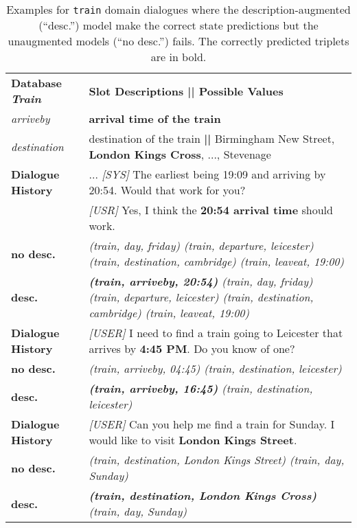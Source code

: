\documentclass[11pt]{article}
\begin{document}
\begin{table*}[t]
    \small
    \centering

    \vspace{-0.5\baselineskip}
    \begin{tabular}{lp{12.0cm}}
\toprule
        \textbf{Database \textit{Train}} & \textbf{Slot Descriptions || Possible Values}\\
        \textit{arriveby}   & \textbf{arrival time of the train} \\
\textit{destination}  & destination of the train \textbf{||} Birmingham New Street, \textbf{London Kings Cross}, ..., Stevenage\\


        \midrule
        \textbf{Dialogue History}  & ... \textit{[SYS]} The earliest being 19:09 and arriving by 20:54. Would that work for you?\\ & \textit{[USR]} Yes, I think the \textbf{20:54 arrival time} should work.\\
        \textbf{no desc.} & \textit{(train, day, friday) (train, departure, leicester) (train, destination, cambridge) (train, leaveat, 19:00)} \\
        \textbf{desc.} & \textit{\textbf{(train, arriveby, 20:54)} (train, day, friday) (train, departure, leicester) (train, destination, cambridge) (train, leaveat, 19:00)} \\
         \midrule
        \textbf{Dialogue History}  & \textit{[USER]} I need to find a train going to Leicester that arrives by \textbf{4:45 PM}. Do you know of one?\\
        \textbf{no desc.} & \textit{(train, arriveby, 04:45) (train, destination, leicester)} \\
        \textbf{desc.} & \textit{\textbf{(train, arriveby, 16:45)} (train, destination, leicester)}\\
        \midrule
        \textbf{Dialogue History}  &  \textit{[USER]} Can you help me find a train for Sunday. I would like to visit \textbf{London Kings Street}.\\
        \textbf{no desc.} &  \textit{(train, destination, London Kings Street) (train, day, Sunday)} \\
        \textbf{desc.} & \textit{\textbf{(train, destination, London Kings Cross)} (train, day, Sunday)}\\
        \bottomrule
    \end{tabular}
        \caption{
        Examples for \texttt{train} domain dialogues where the description-augmented (``desc.'') model make the correct state predictions but the unaugmented models (``no desc.'') fails. The correctly predicted triplets are in bold.}
    \label{tab:correct}
\end{table*}
\end{document}
